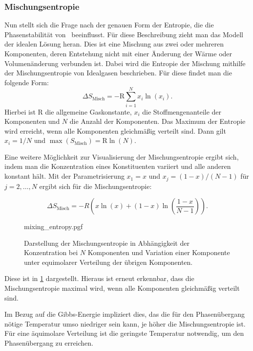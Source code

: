 \subsubsection{Mischungsentropie}
Nun stellt sich die Frage nach der genauen Form der Entropie, die die Phasenstabilität von \heo\ beeinflusst.
Für diese Beschreibung zieht man das Modell der idealen Lösung heran.
Dies ist eine Mischung aus zwei oder mehreren Komponenten, deren Entstehung nicht mit einer Änderung der
Wärme oder Volumenänderung verbunden ist.
Dabei wird die Entropie der Mischung mithilfe der Mischungsentropie von Idealgasen beschrieben.
Für diese findet man die folgende Form:
\begin{equation}
    \Delta S_{\text{Misch}} = -\mathrm{R} \sum_{i=1}^N x_{i} \ln(x_{i}).
    \label{eq:Mischungsentropie}
\end{equation}
Hierbei ist $\mathrm{R}$ die allgemeine Gaskonstante, $x_{i}$ die Stoffmengenanteile der Komponenten und $N$ die Anzahl
der Komponenten.
Das Maximum der Entropie wird erreicht, wenn alle Komponenten gleichmäßig verteilt sind.
Dann gilt $x_{i}=1/N$ und $\max(S_{\text{Misch}}) = \mathrm{R} \ln(N)$.\autocite[7]{rost_phd}

Eine weitere Möglichkeit zur Visualisierung der Mischungsentropie ergibt sich, indem man die Konzentration eines
Konstituenten variiert und alle anderen konstant hält.
Mit der Parametrisierung $x_{1} = x$ und $x_{j} = (1-x) / (N-1)$ für $j=2, \dots, N$ ergibt sich für die
Mischungsentropie:

\begin{equation}
    \Delta S_{\text{Misch}} = -R \left( x \ln(x) + (1-x) \ln \left( \frac{1-x}{N-1} \right) \right).
    \label{eq:Mischungsentropie2}
\end{equation}

\begin{figure}
    \centering
    {mixing_entropy.pgf}
    \caption{Darstellung der Mischungsentropie in Abhängigkeit der Konzentration bei $N$ Komponenten und Variation einer
    Komponente unter equimolarer Verteilung der übrigen Komponenten.
    }
    \label{fig:Mischungsentropie}
\end{figure}

Diese ist in \cref{fig:Mischungsentropie} dargestellt.
Hieraus ist erneut erkennbar, dass die Mischungsentropie maximal wird, wenn alle Komponenten gleichmäßig verteilt sind.
\autocite[3]{Rost2015}

Im Bezug auf die Gibbs-Energie impliziert dies, das die für den Phasenübergang nötige Temperatur umso niedriger sein
kann, je höher die Mischungsentropie ist.
Für eine äquimolare Verteilung ist die geringste Temperatur notwendig, um den Phasenübergang zu erreichen.

